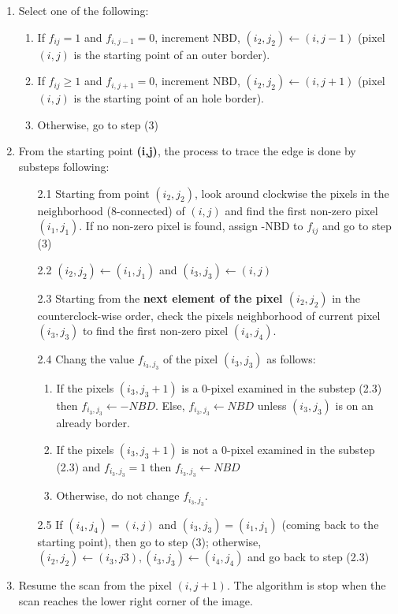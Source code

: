 \begin{enumerate}
	\item Select one of the following:
		\begin{enumerate}
			\item If \textbf{$f_{ij} = 1$} and \textbf{$f_{i,j-1} = 0$}, increment NBD, $(i_2,j_2) \gets (i,j-1)$ (pixel $(i,j)$ is the starting point of an outer border).
			\item If \textbf{$f_{ij} \geq 1$} and \textbf{$f_{i,j+1} = 0$}, increment NBD, $(i_2,j_2) \gets (i,j+1)$ (pixel $(i,j)$ is the starting point of an hole border).
			\item Otherwise, go to step (3)
		\end{enumerate}
	\item From the starting point \textbf{(i,j)}, the process to trace the edge is done by substeps following:
		\begin{itemize}
			\item[2.1] Starting from point $(i_2,j_2)$, look around clockwise the pixels in the neighborhood (8-connected) of $(i,j)$ and find the first non-zero pixel $(i_1,j_1)$. If no non-zero pixel is found, assign -NBD to $f_{ij}$ and go to step (3)
			\item[2.2] $(i_2,j_2) \gets (i_1,j_1)$ and $(i_3,j_3) \gets (i,j)$
			\item[2.3] Starting from the \textbf{next element of the pixel $(i_2,j_2)$} in the counterclock-wise order, check the pixels neighborhood of current pixel $(i_3,j_3)$ to find the first non-zero pixel $(i_4,j_4)$.
			\item[2.4] Chang the value $f_{i_3,j_3}$ of the pixel $(i_3,j_3)$ as follows:
				\begin{enumerate}
					\item If the pixels $(i_3,j_3+1)$ is a 0-pixel examined in the substep (2.3) then $f_{i_3,j_3} \gets -NBD$. Else, $f_{i_3,j_3} \gets NBD$ unless $(i_3,j_3)$ is on an already border.
					\item If the pixels $(i_3,j_3+1)$ is not a 0-pixel examined in the substep (2.3) and $f_{i_3,j_3} = 1$ then $f_{i_3,j_3} \gets NBD$
					\item Otherwise, do not change $f_{i_3,j_3}$.
				\end{enumerate}
			\item[2.5] If $(i_4,j_4) = (i,j)$ and $(i_3,j_3) = (i_1,j_1)$ (coming back to the starting point), then go to step (3); otherwise, $(i_2,j_2) \gets (i_3,j3), (i_3,j_3) \gets (i_4,j_4)$ and go back to step (2.3)
		\end{itemize}
	\item Resume the scan from the pixel $(i,j+1)$. The algorithm is stop when the scan reaches the lower right corner of the image.
\end{enumerate}
